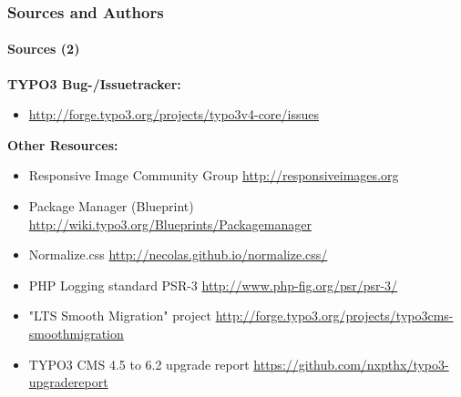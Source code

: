 
\begin{frame}[fragile]
	\frametitle{Sources and Authors}
	\framesubtitle{Sources (2)}

	\textbf{TYPO3 Bug-/Issuetracker:}
		\begin{itemize}\smaller
			\item \url{http://forge.typo3.org/projects/typo3v4-core/issues}
		\end{itemize}

	\textbf{Other Resources:}
		\begin{itemize}\smaller

			\item Responsive Image Community Group\newline
				\url{http://responsiveimages.org}

			\item Package Manager (Blueprint)\newline
				\url{http://wiki.typo3.org/Blueprints/Packagemanager}

			\item Normalize.css\newline
				\url{http://necolas.github.io/normalize.css/}

			\item PHP Logging standard PSR-3\newline
				\url{http://www.php-fig.org/psr/psr-3/}

			\item "LTS Smooth Migration" project\newline
				\url{http://forge.typo3.org/projects/typo3cms-smoothmigration}

			\item TYPO3 CMS 4.5 to 6.2 upgrade report
				\url{https://github.com/nxpthx/typo3-upgradereport}

		\end{itemize}

\end{frame}


